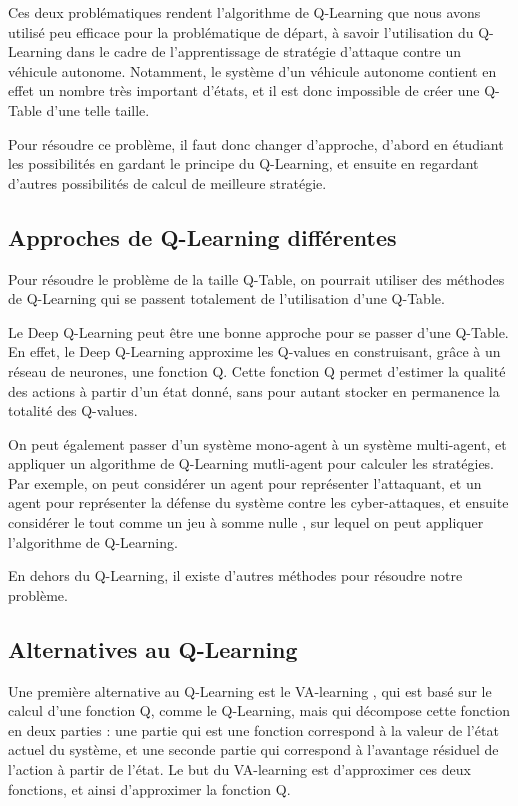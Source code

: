 \documentclass[a4paper]{article}
\begin{document}
    Ces deux problématiques rendent l'algorithme de Q-Learning que nous avons utilisé peu efficace pour la problématique de départ, à savoir l'utilisation du Q-Learning dans le cadre de l'apprentissage de stratégie d'attaque contre un véhicule autonome.
    Notamment, le système d'un véhicule autonome contient en effet un nombre très important d'états, et il est donc impossible de créer une Q-Table d'une telle taille.
    
    Pour résoudre ce problème, il faut donc changer d'approche, d'abord en étudiant les possibilités en gardant le principe du Q-Learning, et ensuite en regardant d'autres possibilités de calcul de meilleure stratégie.

    \subsection{Approches de Q-Learning différentes}

    Pour résoudre le problème de la taille Q-Table, on pourrait utiliser des méthodes de Q-Learning qui se passent totalement de l'utilisation d'une Q-Table.

    Le Deep Q-Learning \cite{liu_deep_2017} peut être une bonne approche pour se passer d'une Q-Table.
    En effet, le Deep Q-Learning approxime les Q-values en construisant, grâce à un réseau de neurones, une fonction Q.
    Cette fonction Q permet d'estimer la qualité des actions à partir d'un état donné, sans pour autant stocker en permanence la totalité des Q-values.

    On peut également passer d'un système mono-agent à un système multi-agent, et appliquer un algorithme de Q-Learning mutli-agent pour calculer les stratégies.
    Par exemple, on peut considérer un agent pour représenter l'attaquant, et un agent pour représenter la défense du système contre les cyber-attaques, et ensuite considérer le tout comme un jeu à somme nulle \cite{panfili_game-theoretical_2018}, sur lequel on peut appliquer l'algorithme de Q-Learning.

    En dehors du Q-Learning, il existe d'autres méthodes pour résoudre notre problème.

    \subsection{Alternatives au Q-Learning}

    Une première alternative au Q-Learning est le VA-learning \cite{tang_va-learning_2023}, qui est basé sur le calcul d'une fonction Q, comme le Q-Learning, mais qui décompose cette fonction en deux parties : une partie qui est une fonction correspond à la valeur de l'état actuel du système, et une seconde partie qui correspond à l'avantage résiduel de l'action à partir de l'état.
    Le but du VA-learning est d'approximer ces deux fonctions, et ainsi d'approximer la fonction Q.
\end{document}
